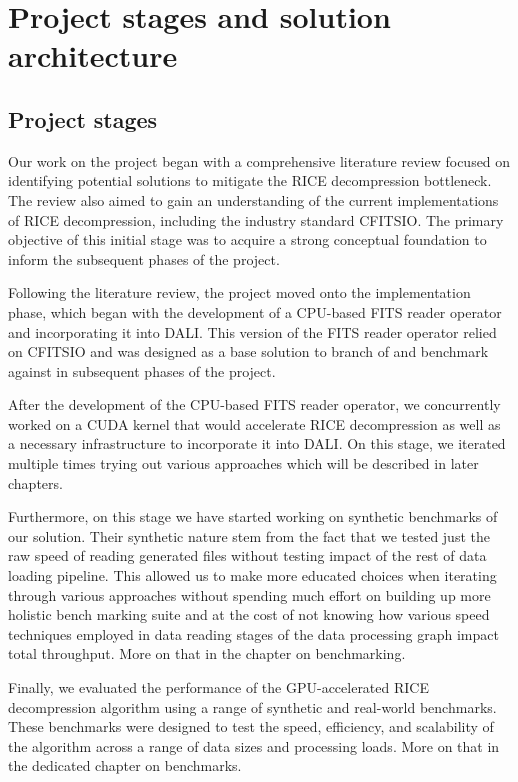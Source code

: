 \documentclass[licencjacka,en]{pracamgr}
\begin{document}
\chapter{Project stages and solution architecture}
\section{Project stages}
Our work on the project began with a comprehensive literature review focused on identifying potential solutions to mitigate the RICE decompression bottleneck. The review also aimed to gain an understanding of the current implementations of RICE decompression, including the industry standard CFITSIO. The primary objective of this initial stage was to acquire a strong conceptual foundation to inform the subsequent phases of the project.

Following the literature review, the project moved onto the implementation phase, which began with the development of a CPU-based FITS reader operator and incorporating it into DALI. This version of the FITS reader operator relied on CFITSIO and was designed as a base solution to branch of and  benchmark against in subsequent phases of the project. 

After the development of the CPU-based FITS reader operator, we concurrently worked on a CUDA kernel that would accelerate RICE decompression as well as a necessary infrastructure to incorporate it into DALI. On this stage, we iterated multiple times trying out various approaches which will be described in later chapters.

Furthermore, on this stage we have started working on synthetic benchmarks of our solution. Their synthetic nature stem from the fact that we tested just the raw speed of reading generated files without testing impact of the rest of data loading pipeline. This allowed us to make more educated choices when iterating through various approaches without spending much effort on building up more holistic bench marking suite and at the cost of not knowing how various speed techniques employed in data reading stages of the data processing graph impact total throughput. More on that in the chapter on benchmarking. 

Finally, we evaluated the performance of the GPU-accelerated RICE decompression algorithm using a range of synthetic and real-world benchmarks. These benchmarks were designed to test the speed, efficiency, and scalability of the algorithm across a range of data sizes and processing loads. More on that in the dedicated chapter on benchmarks. 
\end{document}
